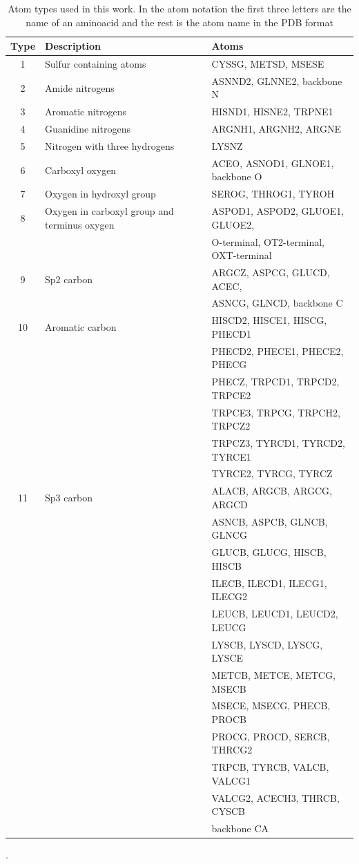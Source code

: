 \documentclass[a4paper,10pt]{article}
\begin{document}
\begin{table}[H]
\begin{center}
\begin{tabular}{ c | l | l }
    
    Type & Description & Atoms \\
    \hline
    1 & Sulfur containing atoms & CYSSG, METSD, MSESE \\ \hline
    2 & Amide nitrogens & ASNND2, GLNNE2, backbone N \\ \hline
    3 & Aromatic nitrogens & HISND1, HISNE2, TRPNE1 \\ \hline
    4 & Guanidine nitrogens & ARGNH1, ARGNH2, ARGNE \\ \hline
    5 & Nitrogen with three hydrogens & LYSNZ \\ \hline
    6 & Carboxyl oxygen & ACEO, ASNOD1, GLNOE1, backbone O \\ \hline
    7 & Oxygen in hydroxyl group & SEROG, THROG1, TYROH \\ \hline
    8 & Oxygen in carboxyl group and terminus oxygen & ASPOD1, ASPOD2, GLUOE1, GLUOE2, \\
     & &  O-terminal, OT2-terminal, OXT-terminal \\ \hline
    9 & Sp2 carbon & ARGCZ, ASPCG, GLUCD, ACEC, \\
     & & ASNCG, GLNCD, backbone C \\ \hline
    10 & Aromatic carbon & HISCD2, HISCE1, HISCG, PHECD1 \\
     & & PHECD2, PHECE1, PHECE2, PHECG \\ 
     & & PHECZ, TRPCD1, TRPCD2, TRPCE2 \\
     & & TRPCE3, TRPCG, TRPCH2, TRPCZ2 \\
     & & TRPCZ3, TYRCD1, TYRCD2, TYRCE1 \\
     & & TYRCE2, TYRCG, TYRCZ \\ \hline
    11 & Sp3 carbon & ALACB, ARGCB, ARGCG, ARGCD \\
     & & ASNCB, ASPCB, GLNCB, GLNCG \\
     & & GLUCB, GLUCG, HISCB, HISCB \\
     & & ILECB, ILECD1, ILECG1, ILECG2 \\
     & & LEUCB, LEUCD1, LEUCD2, LEUCG \\
     & & LYSCB, LYSCD, LYSCG, LYSCE \\
     & & METCB, METCE, METCG, MSECB \\
     & & MSECE, MSECG, PHECB, PROCB \\
     & & PROCG, PROCD, SERCB, THRCG2 \\
     & & TRPCB, TYRCB, VALCB, VALCG1 \\
     & & VALCG2, ACECH3, THRCB, CYSCB \\
     & & backbone CA \\ \hline
    
\end{tabular}
    
    \caption {Atom types used in this work. In the atom notation the first three letters are the name of an aminoacid and the rest is 
    the atom name in the PDB format \cite{}}.
    \label{Tbl:atomTypes}
\end{center}
\end{table}
\end{document}
